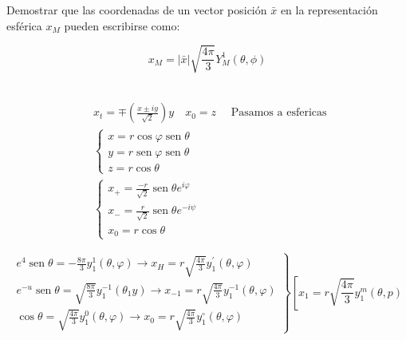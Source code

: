 Demostrar que las coordenadas de un vector posición $\bar{x}$ en la representación esférica $x_M$ pueden escribirse como:

$$
x_{M}=|\bar{x}| \sqrt{\frac{4 \pi}{3}} Y_{M}^{1}(\theta, \phi)
$$

\begin{solution}\ \\
$$
\begin{aligned}
&x_{t}=\mp\left(\frac{x \pm i y}{\sqrt{2}}\right) y \quad x_{0}=z \quad \text { Pasamos a esfericas }\\
&\left\{\begin{array}{l}
{x=r \cos \varphi \operatorname{sen} \theta} \\
{y=r \operatorname{sen} \varphi \operatorname{sen} \theta} \\
{z=r \cos \theta}
\end{array}\right.\\
&\left\{\begin{array}{l}
{x_{+}=\frac{-r}{\sqrt{2}} \operatorname{sen} \theta e^{i \varphi}} \\
{x_{-}=\frac{r}{\sqrt{2}} \operatorname{sen} \theta e^{-i \psi}} \\
{x_{0}=r \cos \theta}
\end{array}\right.
\end{aligned}
$$

$$
\left.\begin{array}{l}
{e^{4} \operatorname{sen} \theta=-\frac{8 \pi}{3} y_{1}^{1}(\theta, \varphi) \rightarrow x_{H}=r \sqrt{\frac{4 \pi}{3}} y_{1}^{\prime}(\theta, \varphi)} \\
{e^{-u} \operatorname{sen} \theta=\sqrt{\frac{8 \pi}{3}} y_{1}^{-1}\left(\theta_{1} y\right) \rightarrow x_{-1}=r \sqrt{\frac{4 \pi}{3}} y_{1}^{-1}(\theta, \varphi)} \\
{\cos \theta=\sqrt{\frac{4 \pi}{3}} y_{1}^{0}(\theta, \varphi) \longrightarrow x_{0}=r \sqrt{\frac{4 \pi}{3}} y_{1}^{\circ}(\theta, \varphi)}
\end{array}\right\}\left[x_{1}=r \sqrt{\frac{4 \pi}{3}} y_{1}^{m}(\theta, p)\right.
$$
\end{solution}